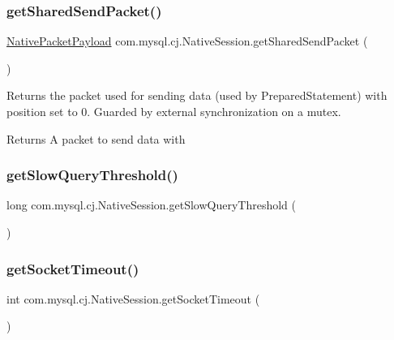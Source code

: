 \subsubsection{\texorpdfstring{get\+Shared\+Send\+Packet()}{getSharedSendPacket()}}
{\footnotesize\ttfamily \mbox{\hyperlink{classcom_1_1mysql_1_1cj_1_1protocol_1_1a_1_1_native_packet_payload}{Native\+Packet\+Payload}} com.\+mysql.\+cj.\+Native\+Session.\+get\+Shared\+Send\+Packet (\begin{DoxyParamCaption}{ }\end{DoxyParamCaption})}

Returns the packet used for sending data (used by Prepared\+Statement) with position set to 0. Guarded by external synchronization on a mutex.

\begin{DoxyReturn}{Returns}
A packet to send data with 
\end{DoxyReturn}
\mbox{\label{classcom_1_1mysql_1_1cj_1_1_native_session_ae23927cce89ee197455c3524be0266b0}} 
\subsubsection{\texorpdfstring{get\+Slow\+Query\+Threshold()}{getSlowQueryThreshold()}}
{\footnotesize\ttfamily long com.\+mysql.\+cj.\+Native\+Session.\+get\+Slow\+Query\+Threshold (\begin{DoxyParamCaption}{ }\end{DoxyParamCaption})}

\mbox{\label{classcom_1_1mysql_1_1cj_1_1_native_session_a65e529c9db707ecccd842853281963c8}} 
\subsubsection{\texorpdfstring{get\+Socket\+Timeout()}{getSocketTimeout()}}
{\footnotesize\ttfamily int com.\+mysql.\+cj.\+Native\+Session.\+get\+Socket\+Timeout (\begin{DoxyParamCaption}{ }\end{DoxyParamCaption})}


